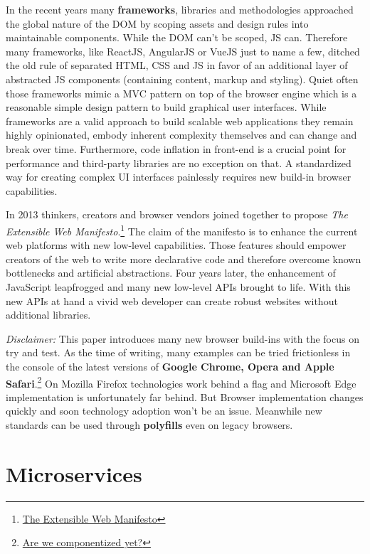 \documentclass[]{assets/latex/ieee}
\begin{document}
In the recent years many \textbf{frameworks}, libraries and
methodologies approached the global nature of the DOM by scoping assets
and design rules into maintainable components. While the DOM can't be
scoped, JS can. Therefore many frameworks, like ReactJS, AngularJS or
VueJS just to name a few, ditched the old rule of separated HTML, CSS
and JS in favor of an additional layer of abstracted JS components
(containing content, markup and styling). Quiet often those frameworks
mimic a MVC pattern on top of the browser engine which is a reasonable
simple design pattern to build graphical user interfaces. While
frameworks are a valid approach to build scalable web applications they
remain highly opinionated, embody inherent complexity themselves and can
change and break over time. Furthermore, code inflation in front-end is
a crucial point for performance and third-party libraries are no
exception on that. A standardized way for creating complex UI interfaces
painlessly requires new build-in browser capabilities.

In 2013 thinkers, creators and browser vendors joined together to
propose \emph{The Extensible Web Manifesto}.\footnote{\href{https://extensiblewebmanifesto.org/}{The
  Extensible Web Manifesto}} The claim of the manifesto is to enhance
the current web platforms with new low-level capabilities. Those
features should empower creators of the web to write more declarative
code and therefore overcome known bottlenecks and artificial
abstractions. Four years later, the enhancement of JavaScript
leapfrogged and many new low-level APIs brought to life. With this new
APIs at hand a vivid web developer can create robust websites without
additional libraries.

\emph{Disclaimer:} This paper introduces many new browser build-ins with
the focus on try and test. As the time of writing, many examples can be
tried frictionless in the console of the latest versions of
\textbf{Google Chrome, Opera and Apple Safari}.\footnote{\href{http://jonrimmer.github.io/are-we-componentized-yet/}{Are
  we componentized yet?}} On Mozilla Firefox technologies work behind a
flag and Microsoft Edge implementation is unfortunately far behind. But
Browser implementation changes quickly and soon technology adoption
won't be an issue. Meanwhile new standards can be used through
\textbf{polyfills} even on legacy browsers.

\section{Microservices}\label{microservices}
\end{document}
